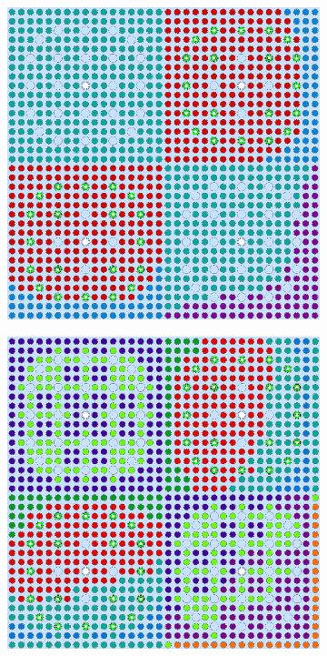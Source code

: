 \begin{appendices}
\begin{figure}[h!]
\begin{subfigure}{0.48\textwidth}
  \includegraphics[width=0.85\linewidth]{figures/unsupervised/geometries/without-features/2-clusters/combined/reflector}
  \caption{}
  \label{fig:no-features-reflector-combined-2}
\end{subfigure}
\begin{subfigure}{0.48\textwidth}
  \centering
  \includegraphics[width=0.85\linewidth]{figures/unsupervised/geometries/without-features/4-clusters/pinch/reflector}
  \caption{}
  \label{fig:no-features-reflector-pinch-4}
\end{subfigure}%

\end{figure}
\end{appendices}
